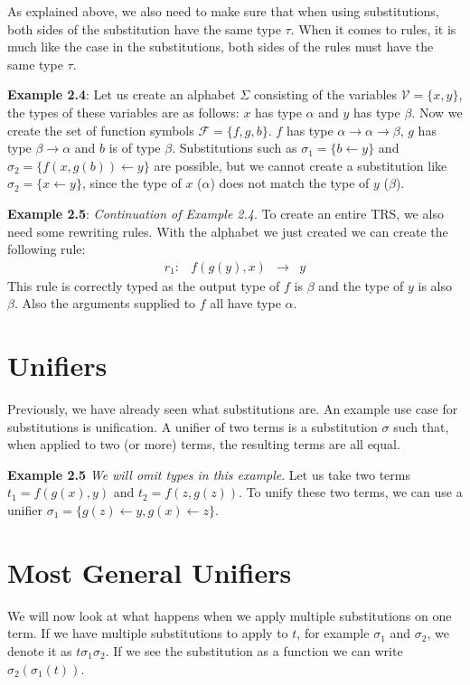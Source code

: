 As explained above, we also need to make sure that when using substitutions, both sides of the substitution have the same type $\tau$. When it comes to rules, it is much like the case in the substitutions, both sides of the rules must have the same type $\tau$.

\textbf{Example 2.4}: Let us create an alphabet $\Sigma$ consisting of the variables $\mathcal{V} = \{ x, y\}$, the types of these variables are as follows: $x$ has type $\alpha$ and $y$ has type $\beta$. Now we create the set of function symbols $\mathcal{F} = \{ f, g, b \}$. $f$ has type $\alpha \rightarrow \alpha \rightarrow \beta$, $g$ has type $\beta \rightarrow \alpha$ and $b$ is of type $\beta$. Substitutions such as $\sigma_1 = \{ b \leftarrow y \}$ and $\sigma_2 = \{ f(x, g(b)) \leftarrow y \}$ are possible, but we cannot create a substitution like $\sigma_2 = \{ x \leftarrow y \}$, since the type of $x$ ($\alpha$) does not match the type of $y$ ($\beta$).

\textbf{Example 2.5}: \textit{Continuation of Example 2.4}. To create an entire TRS, we also need some rewriting rules. With the alphabet we just created we can create the following rule: 
$$
\begin{array}{lrcl}
    r_1: & f(g(y), x) & \rightarrow & y
\end{array}
$$
This rule is correctly typed as the output type of $f$ is $\beta$ and the type of $y$ is also $\beta$. Also the arguments supplied to $f$ all have type $\alpha$. 

\section{Unifiers}
Previously, we have already seen what substitutions are. An example use case for substitutions is unification. A unifier of two terms is a substitution $\sigma$ such that, when applied to two (or more) terms, the resulting terms are all equal. 

\textbf{Example 2.5} \textit{We will omit types in this example}. Let us take two terms $t_1 = f(g(x), y)$ and $t_2 = f(z, g(z))$. To unify these two terms, we can use a unifier $\sigma_1 = \{ g(z) \leftarrow y, g(x) \leftarrow z \}$.

\section{Most General Unifiers}
We will now look at what happens when we apply multiple substitutions on one term. If we have multiple substitutions to apply to $t$, for example $\sigma_1$ and $\sigma_2$, we denote it as $t\sigma_1\sigma_2$. If we see the substitution as a function we can write $\sigma_2\left( \sigma_1(t)\right)$.

